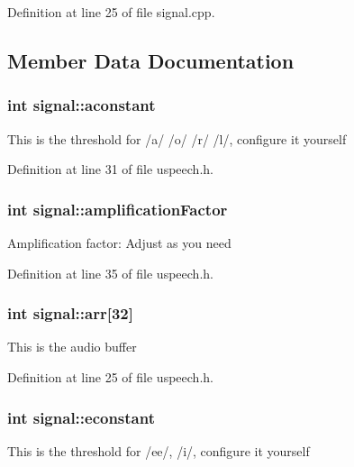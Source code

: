 Definition at line 25 of file signal.\-cpp.



\subsection{Member Data Documentation}
\hypertarget{classsignal_ad300e73d67f1870bbbc5cfcece5910ec}{
\subsubsection[{aconstant}]{\setlength{\rightskip}{0pt plus 5cm}int signal\-::aconstant}}\label{classsignal_ad300e73d67f1870bbbc5cfcece5910ec}
This is the threshold for /a/ /o/ /r/ /l/, configure it yourself 

Definition at line 31 of file uspeech.\-h.

\hypertarget{classsignal_a16d895fcf95efa3327fd7342f7bde145}{
\subsubsection[{amplification\-Factor}]{\setlength{\rightskip}{0pt plus 5cm}int signal\-::amplification\-Factor}}\label{classsignal_a16d895fcf95efa3327fd7342f7bde145}
Amplification factor\-: Adjust as you need 

Definition at line 35 of file uspeech.\-h.

\hypertarget{classsignal_a3e2d5027e6570321f8d1a823b0d47af0}{
\subsubsection[{arr}]{\setlength{\rightskip}{0pt plus 5cm}int signal\-::arr\mbox{[}32\mbox{]}}}\label{classsignal_a3e2d5027e6570321f8d1a823b0d47af0}
This is the audio buffer 

Definition at line 25 of file uspeech.\-h.

\hypertarget{classsignal_aa346a5acfecf429893ab85bc4a903875}{
\subsubsection[{econstant}]{\setlength{\rightskip}{0pt plus 5cm}int signal\-::econstant}}\label{classsignal_aa346a5acfecf429893ab85bc4a903875}
This is the threshold for /ee/, /i/, configure it yourself 

